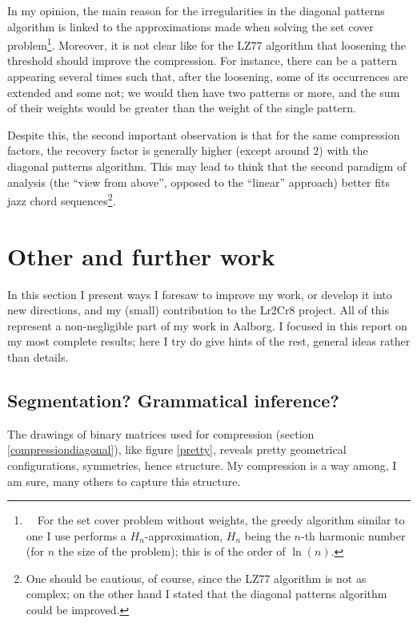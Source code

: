 \documentclass[a4paper,10pt]{article}
\newcommand{\guill}[1]{``#1''}
\begin{document}
In my opinion, the main reason for the irregularities in the diagonal patterns algorithm is linked to the approximations made when solving the set cover problem\footnote{~~For the set cover problem without weights, the greedy algorithm similar to one I use performs a $H_n$-approximation, $H_n$ being the $n$-th harmonic number (for $n$ the size of the problem); this is of the order of $\ln(n)$.}.
Moreover, it is not clear like for the LZ77 algorithm that loosening the threshold should improve the compression. For instance, there can be a pattern appearing several times such that, after the loosening, some of its occurrences are extended and some not; we would then have two patterns or more, and the sum of their weights would be greater than the weight of the single pattern.

Despite this, the second important observation is that for the same compression factors, the recovery factor is generally higher (except around $2$) with the diagonal patterns algorithm. This may lead to think that the second paradigm of analysis (the \guill{view from above}, opposed to the \guill{linear} approach) better fits jazz chord sequences\footnote{One should be cautious, of course, since the LZ77 algorithm is not as complex; on the other hand I stated that the diagonal patterns algorithm could be improved.}.



\newpage
\section{Other and further work}

In this section I present ways I foresaw to improve my work, or develop it into new directions, and my (small) contribution to the Lr2Cr8 project. All of this represent a non-negligible part of my work in Aalborg. I focused in this report on my most complete results; here I try do give hints of the rest, general ideas rather than details.


\subsection{Segmentation? Grammatical inference?}

The drawings of binary matrices used for compression (section \ref{compressiondiagonal}), like figure \ref{pretty}, reveals pretty geometrical configurations, symmetries, hence structure. My compression is a way among, I am sure, many others to capture this structure.
\end{document}
